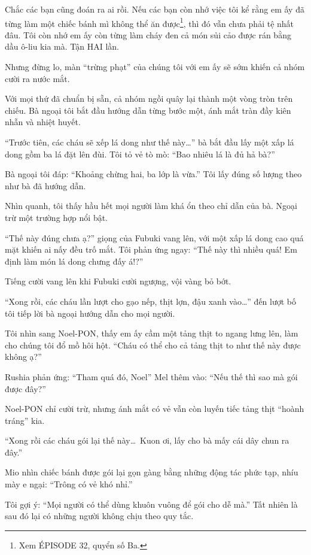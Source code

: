 \documentclass[../main.tex]{subfiles}
\begin{document}
Chắc các bạn cũng đoán ra ai rồi. Nếu các bạn còn nhớ việc tôi kể rằng em ấy đã từng làm một chiếc bánh mì không thể ăn được\footnote{Xem {\flaregothic ÉPISODE 32}, quyển số Ba.}, thì đó vẫn chưa phải tệ nhất đâu. Tôi còn nhớ em ấy còn từng làm cháy đen cả món sủi cảo được rán bằng dầu ô-liu kia mà. Tận HAI lần.

Nhưng đừng lo, màn ``trừng phạt'' của chúng tôi với em ấy sẽ sớm khiến cả nhóm cười ra nước mắt.

\ct

Với mọi thứ đã chuẩn bị sẵn, cả nhóm ngồi quây lại thành một vòng tròn trên chiếu. Bà ngoại tôi bắt đầu hướng dẫn từng bước một, ánh mắt tràn đầy kiên nhẫn và nhiệt huyết.

``Trước tiên, các cháu sẽ xếp lá dong như thế này\dots'' bà bắt đầu lấy một xấp lá dong gồm ba lá đặt lên đùi. Tôi tỏ vẻ tò mò: ``Bao nhiêu lá là đủ hả bà?''

Bà ngoại tôi đáp: ``Khoảng chừng hai, ba lớp là vừa.'' Tôi lấy đúng số lượng theo như bà đã hướng dẫn.

Nhìn quanh, tôi thấy hầu hết mọi người làm khá ổn theo chỉ dẫn của bà. Ngoại trừ một trường hợp nổi bật.

``Thế này đúng chưa ạ?'' giọng của Fubuki vang lên, với một xấp lá dong cao quá mặt khiến ai nấy đều trố mắt. Tôi phản ứng ngay: ``Thế này thì nhiều quá! Em định làm món lá dong chưng đấy á!?''

Tiếng cười vang lên khi Fubuki cười ngượng, vội vàng bỏ bớt.

\ct

``Xong rồi, các cháu lần lượt cho gạo nếp, thịt lợn, đậu xanh vào\dots'' đến lượt bố tôi tiếp lời bà ngoại hướng dẫn cho mọi người.

Tôi nhìn sang Noel-PON, thấy em ấy cầm một tảng thịt to ngang lưng lên, làm cho chúng tôi đổ mồ hôi hột. ``Cháu có thể cho cả tảng thịt to như thế này được không ạ?''

Rushia phản ứng: ``Tham quá đó, Noel'' Mel thêm vào: ``Nếu thế thì sao mà gói được đây?''

Noel-PON chỉ cười trừ, nhưng ánh mắt có vẻ vẫn còn luyến tiếc tảng thịt ``hoành tráng'' kia.

\ct

``Xong rồi các cháu gói lại thế này\dots\ Kuon ơi, lấy cho bà mấy cái dây chun ra đây.''

Mio nhìn chiếc bánh được gói lại gọn gàng bằng những động tác phức tạp, nhíu mày e ngại: ``Trông có vẻ khó nhỉ.''

Tôi gợi ý: ``Mọi người có thể dùng khuôn vuông để gói cho dễ mà.'' Tất nhiên là sau đó lại có những người không chịu theo quy tắc.
\end{document}
